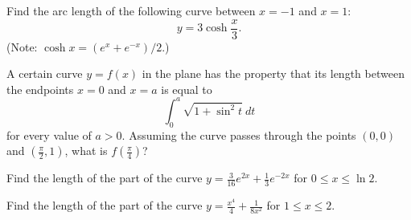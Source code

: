 \documentclass{ximera}
\begin{document}
\begin{question}%
 Find the arc length of the following curve between $x=-1$ and $x=1$:
\[ y = 3 \cosh \frac{x}{3}. \]
(Note: $\cosh x = (e^x + e^{-x})/2$.)
\begin{multiplechoice}
\end{multiplechoice}

\end{question}

\begin{question}
 A certain curve $y = f(x)$ in the plane has the property that its length between the endpoints $x=0$ and $x=a$ is equal to
\[ \int_0^a \sqrt{1 + \sin^2 t} ~ dt \]
for every value of $a > 0$.  Assuming the curve passes through the points $(0,0)$ and $\left(\frac{\pi}{2},1\right)$, what is $f\left( \frac{\pi}{4} \right)$?
\begin{multipleChoice} 
\end{multipleChoice}
\end{question}

\begin{question}%

Find the length of the part of the curve \(\displaystyle y = \frac{3}{16} e^{2x} + \frac{1}{3} e^{-2x}\) for \(0 \leq x \leq \ln 2\).
\begin{multiplechoice}
\end{multiplechoice}

\end{question}

\begin{question}%

Find the length of the part of the curve \(\displaystyle y = \frac{x^4}{4} + \frac{1}{8x^2}\) for \(1 \leq x \leq 2\).
\begin{multiplechoice}
\end{multiplechoice}

\end{question}
\end{document}
